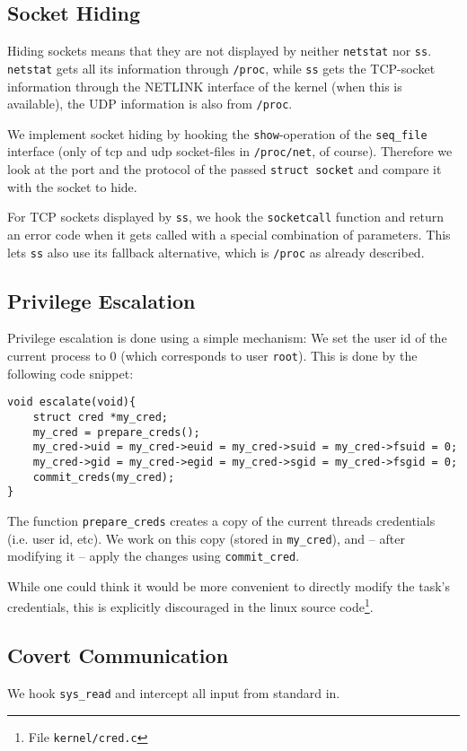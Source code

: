 \documentclass[10pt, letterpaper]{scrartcl}
\begin{document}
\subsection{Socket Hiding}
\label{sec:sockethiding}
Hiding sockets means that they are not displayed by neither \texttt{netstat} nor \texttt{ss}. \texttt{netstat} gets all its information through \texttt{/proc}, while \texttt{ss} gets the TCP-socket information through the NETLINK interface of the kernel (when this is available), the UDP information is also from \texttt{/proc}.

We implement socket hiding by hooking the \texttt{show}-operation of the \texttt{seq\_file} interface (only of tcp and udp socket-files in \texttt{/proc/net}, of course). Therefore we look at the port and the protocol of the passed \texttt{struct socket} and compare it with the socket to hide.

For TCP sockets displayed by \texttt{ss}, we hook the \texttt{socketcall} function and return an error code when it gets called with a special combination of parameters. This lets \texttt{ss} also use its fallback alternative, which is \texttt{/proc} as already described.

\subsection{Privilege Escalation}
\label{sec:privilege_escalation}
Privilege escalation is done using a simple mechanism: We set the user id of the current process to 0 (which corresponds to user \texttt{root}). This is done by the following code snippet:

\begin{verbatim}
void escalate(void){
    struct cred *my_cred;
    my_cred = prepare_creds(); 
    my_cred->uid = my_cred->euid = my_cred->suid = my_cred->fsuid = 0;
    my_cred->gid = my_cred->egid = my_cred->sgid = my_cred->fsgid = 0;
    commit_creds(my_cred);
}
\end{verbatim}

The function \texttt{prepare\_creds} creates a copy of the current threads credentials (i.e. user id, etc). We work on this copy (stored in \texttt{my\_cred}), and -- after modifying it -- apply the changes using \texttt{commit\_cred}.

While one could think it would be more convenient to directly modify the task's credentials, this is explicitly discouraged in the linux source code\footnote{File \texttt{kernel/cred.c}}.

\subsection{Covert Communication}
\label{sec:covert_communication}
We hook \texttt{sys\_read} and intercept all input from standard in. 
\end{document}
